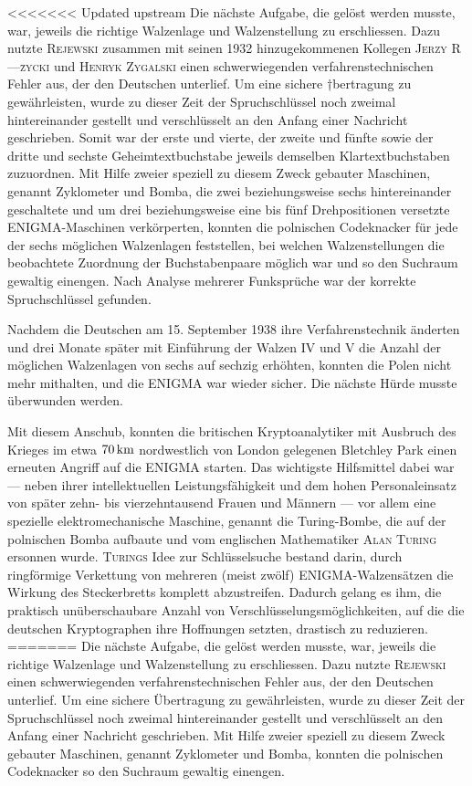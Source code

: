 \documentclass[%
<<<<<<< Updated upstream
11pt,%
twoside,%
titlepage,%
german,%
headsepline%
]{scrartcl}
\begin{document}
<<<<<<< Updated upstream
Die nächste Aufgabe, die gelöst werden musste, war, jeweils die richtige Walzenlage und Walzenstellung zu erschliessen. Dazu nutzte \textsc{Rejewski} zusammen mit seinen 1932 hinzugekommenen Kollegen \textsc{Jerzy R—\`{z}ycki} und \textsc{Henryk Zygalski} einen schwerwiegenden verfahrenstechnischen Fehler aus, der den Deutschen unterlief. Um eine sichere †bertragung zu gewährleisten, wurde zu dieser Zeit der Spruchschlüssel noch zweimal hintereinander gestellt und ver\-schlüs\-selt an den Anfang einer Nachricht geschrieben. Somit war der erste und vierte, der zweite und fünfte sowie der dritte und sechste Geheimtextbuchstabe jeweils demselben Klartextbuchstaben zuzuordnen. Mit Hilfe zweier speziell zu diesem Zweck gebauter Maschinen, genannt Zyklometer und Bomba, die zwei beziehungsweise sechs hintereinander geschaltete und um drei beziehungsweise eine bis fünf Drehpositionen versetzte ENIGMA-Maschinen verkörperten, konnten die polnischen Codeknacker für jede der sechs möglichen Walzenlagen feststellen, bei welchen Walzenstellungen die beobachtete Zuordnung der Buchstabenpaare möglich war und so den Suchraum gewaltig einengen. Nach Analyse mehrerer Funksprüche war der korrekte Spruchschlüssel gefunden.

Nachdem die Deutschen am 15. September 1938 ihre Verfahrenstechnik änderten und drei Monate später mit Einführung der Walzen IV und V die Anzahl der möglichen Walzenlagen von sechs auf sechzig erhöhten, konnten die Polen nicht mehr mithalten, und die ENIGMA war wieder sicher. Die nächste Hürde musste überwunden werden.

Mit diesem Anschub, konnten die britischen Kryptoanalytiker mit Ausbruch des Krieges im etwa $\unit[70]{km}$ nordwestlich von London gelegenen Bletchley Park einen erneuten Angriff auf die ENIGMA starten. Das wichtigste Hilfsmittel dabei war --- neben ihrer intellektuellen Leistungsfähigkeit und dem hohen Personaleinsatz von später zehn- bis vierzehntausend Frauen und Männern --- vor allem eine spezielle elektromechanische Maschine, genannt die Turing-Bombe, die auf der polnischen Bomba aufbaute und vom englischen Mathematiker \textsc{Alan Turing} ersonnen wurde. \textsc{Turings} Idee zur Schlüsselsuche bestand darin, durch ringförmige Verkettung von mehreren (meist zwölf) ENIGMA-Walzensätzen die Wirkung des Steckerbretts komplett abzustreifen. Dadurch gelang es ihm, die praktisch unüberschaubare Anzahl von Verschlüsselungsmöglichkeiten, auf die die deutschen Kryptographen ihre Hoffnungen setzten, drastisch zu reduzieren.
=======
Die nächste Aufgabe, die gelöst werden musste, war, jeweils die richtige Walzenlage und Walzenstellung zu erschliessen. Dazu nutzte \textsc{Rejewski} einen schwerwiegenden verfahrenstechnischen Fehler aus, der den Deutschen unterlief. Um eine sichere Übertragung zu gewährleisten, wurde zu dieser Zeit der Spruchschlüssel noch zweimal hintereinander gestellt und ver\-schlüs\-selt an den Anfang einer Nachricht geschrieben. Mit Hilfe zweier speziell zu diesem Zweck gebauter Maschinen, genannt Zyklometer und Bomba, konnten die polnischen Codeknacker so den Suchraum gewaltig einengen.
\end{document}
